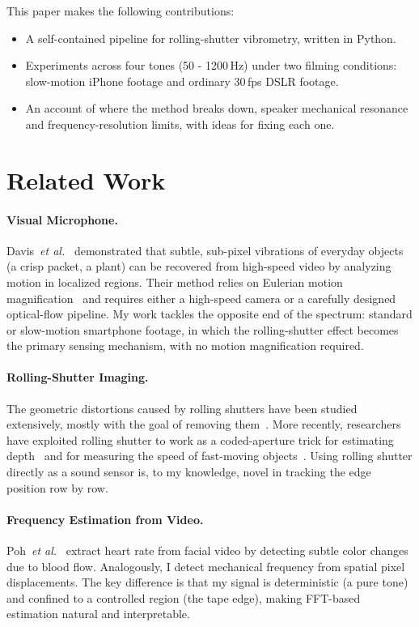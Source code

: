 \documentclass[10pt,twocolumn,letterpaper]{article}
\newcommand{\etal}{\textit{et al.}}
\begin{document}
This paper makes the following contributions:
\begin{itemize}[leftmargin=1.2em,itemsep=1pt,topsep=2pt]
  \item A self-contained pipeline for rolling-shutter vibrometry, written in Python.
  \item Experiments across four tones (50 - 1200\,Hz) under two filming conditions: slow-motion iPhone footage and ordinary 30\,fps DSLR footage.
  \item An account of where the method breaks down, speaker mechanical resonance and frequency-resolution limits, with ideas for fixing each one.
\end{itemize}

\section{Related Work}

\paragraph{Visual Microphone.}
Davis~\etal~\cite{davis2014} demonstrated that subtle, sub-pixel vibrations of everyday objects (a crisp packet, a plant) can be recovered from high-speed video by analyzing motion in localized regions. Their method relies on Eulerian motion magnification~\cite{wu2012} and requires either a high-speed camera or a carefully designed optical-flow pipeline. My work tackles the opposite end of the spectrum: standard or slow-motion smartphone footage, in which the rolling-shutter effect becomes the primary sensing mechanism, with no motion magnification required.

\paragraph{Rolling-Shutter Imaging.}
The geometric distortions caused by rolling shutters have been studied extensively, mostly with the goal of removing them~\cite{forssen2010,grundmann2012}. More recently, researchers have exploited rolling shutter to work as a coded-aperture trick for estimating depth~\cite{albl2016} and for measuring the speed of fast-moving objects~\cite{ringaby2012}. Using rolling shutter directly as a sound sensor is, to my knowledge, novel in tracking the edge position row by row.

\paragraph{Frequency Estimation from Video.}
Poh~\etal~\cite{poh2010} extract heart rate from facial video by detecting subtle color changes due to blood flow. Analogously, I detect mechanical frequency from spatial pixel displacements. The key difference is that my signal is deterministic (a pure tone) and confined to a controlled region (the tape edge), making FFT-based estimation natural and interpretable.
\end{document}
